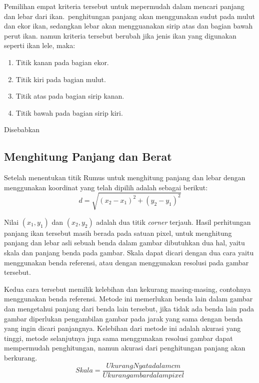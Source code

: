Pemilihan empat kriteria tersebut untuk mepermudah dalam mencari panjang dan lebar dari ikan.~penghitungan panjang akan menggunakan sudut pada mulut dan ekor ikan, sedangkan lebar akan mengguanakan sirip atas dan bagian bawah perut ikan. 
namun kriteria tersebut berubah jika jenis ikan yang digunakan seperti ikan lele, maka:
\begin{enumerate}
    \setlength{\parskip}{0pt}
    \item Titik kanan pada bagian ekor.
    \item Titik kiri pada bagian mulut.
    \item Titik atas pada bagian sirip kanan.
    \item Titik bawah pada bagian sirip kiri.
\end{enumerate}
    Disebabkan


\subsection{Menghitung Panjang dan Berat}
    Setelah menentukan titik Rumus untuk menghitung panjang dan lebar dengan menggunakan koordinat yang telah dipilih adalah sebagai berikut:
\begin{equation}
    d = \sqrt{{(x_2 - x_1)}^2 + {(y_2 - y_1)}^2}
\end{equation}    
    
    Nilai \((x_1, y_1)\) dan \((x_2, y_2)\) adalah dua titik \emph{corner} terjauh. Hasil perhitungan panjang ikan tersebut masih berada pada satuan pixel, untuk menghitung panjang dan lebar asli sebuah benda dalam gambar dibutuhkan dua hal, yaitu skala dan panjang benda pada gambar.
Skala dapat dicari dengan dua cara yaitu menggunakan benda referensi, atau dengan menggunakan resolusi pada gambar tersebut.
    
    Kedua cara tersebut memilik kelebihan dan kekurang masing-masing, contohnya menggunakan benda referensi.
 Metode ini memerlukan benda lain dalam gambar dan mengetahui panjang dari benda lain tersebut, jika tidak ada benda lain pada gambar diperlukan pengambilan gambar pada jarak yang sama dengan benda yang ingin dicari panjangnya.
 Kelebihan dari metode ini adalah akurasi yang tinggi, metode selanjutnya juga sama menggunakan resolusi gambar dapat mempermudah penghitungan, namun akurasi dari penghitungan panjang akan berkurang.
\begin{equation*}
    Skala = \frac{Ukurang Nyata dalam cm}{Ukuran gambar dalam pixel}
\end{equation*}

